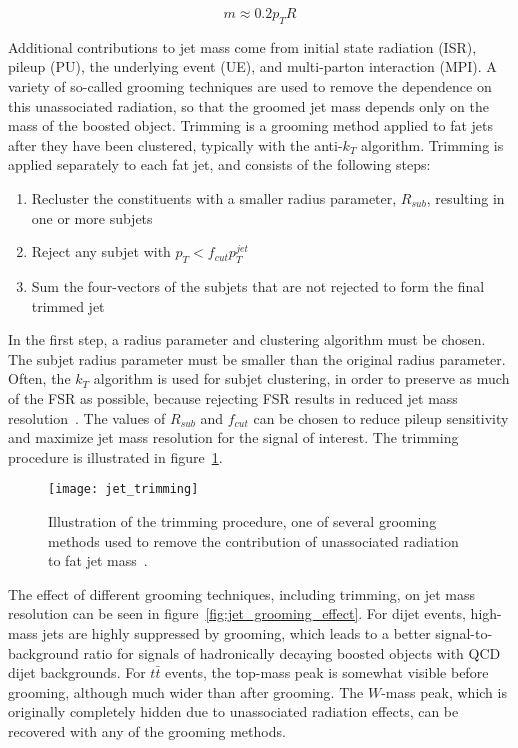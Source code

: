 \begin{equation}\label{eq:jet_mass_nlo}
    m \approx 0.2 p_T R
\end{equation}

Additional contributions to jet mass come from initial state radiation (ISR), pileup (PU), the underlying event (UE), and multi-parton interaction (MPI).
A variety of so-called grooming techniques are used to remove the dependence on this unassociated radiation, so that the groomed jet mass depends only on the mass of the boosted object.
Trimming is a grooming method applied to fat jets after they have been clustered, typically with the anti-$k_T$ algorithm.
Trimming is applied separately to each fat jet, and consists of the following steps:

\begin{enumerate}
    \item Recluster the constituents with a smaller radius parameter, $R_{sub}$, resulting in one or more subjets
    \item Reject any subjet with $p_{T} < f_{cut} p_T^{jet}$
    \item Sum the four-vectors of the subjets that are not rejected to form the final trimmed jet
\end{enumerate}

In the first step, a radius parameter and clustering algorithm must be chosen.
The subjet radius parameter must be smaller than the original radius parameter.
Often, the $k_T$ algorithm is used for subjet clustering, in order to preserve as much of the FSR as possible, because rejecting FSR results in reduced jet mass resolution~\cite{jet-tasi-substructure}.
The values of $R_{sub}$ and $f_{cut}$ can be chosen to reduce pileup sensitivity and maximize jet mass resolution for the signal of interest.
The trimming procedure is illustrated in figure~\ref{fig:jet_trimming}.

\begin{figure}[!ht]
    \centering
\texttt{[image: jet\_trimming]}
\caption{Illustration of the trimming procedure, one of several grooming methods used to remove the contribution
of unassociated radiation to fat jet mass~\cite{jet-grooming-slides}.}
\label{fig:jet_trimming}
\end{figure}

The effect of different grooming techniques, including trimming, on jet mass resolution can be seen in figure~\ref{fig:jet_grooming_effect}.
For dijet events, high-mass jets are highly suppressed by grooming, which leads to a better signal-to-background ratio for signals of hadronically decaying boosted objects with QCD dijet backgrounds.
For $t\bar{t}$ events, the top-mass peak is somewhat visible before grooming, although much wider than after grooming.
The $W$-mass peak, which is originally completely hidden due to unassociated radiation effects, can be recovered with any of the grooming methods.

